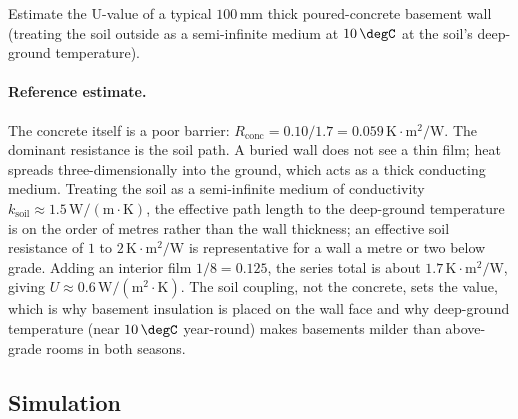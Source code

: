 \begin{exercise}
Estimate the U-value of a typical $100\,\si{\milli\meter}$ thick
poured-concrete basement wall (treating the soil outside as a
semi-infinite medium at $10\,\degC$ at the soil's deep-ground
temperature).
\paragraph{Reference estimate.} The concrete itself is a poor barrier:
$R_{\text{conc}} = 0.10/1.7 = 0.059\,\si{\kelvin}\cdot\text{m}^2/\text{W}$.
The dominant resistance is the soil path. A buried wall does not see a
thin film; heat spreads three-dimensionally into the ground, which acts
as a thick conducting medium. Treating the soil as a semi-infinite
medium of conductivity $k_{\text{soil}} \approx 1.5\,\text{W}/(\text{m}
\cdot\si{\kelvin})$, the effective path length to the deep-ground
temperature is on the order of metres rather than the wall thickness;
an effective soil resistance of $1$ to $2\,\si{\kelvin}\cdot\text{m}^2/
\text{W}$ is representative for a wall a metre or two below grade. Adding
an interior film $1/8 = 0.125$, the series total is about $1.7\,\si{
\kelvin}\cdot\text{m}^2/\text{W}$, giving $U \approx 0.6\,\text{W}/
(\text{m}^2\cdot\si{\kelvin})$. The soil coupling, not the concrete, sets
the value, which is why basement insulation is placed on the wall face
and why deep-ground temperature (near $10\,\degC$ year-round) makes
basements milder than above-grade rooms in both seasons.
\end{exercise}

\subsection*{Simulation}

